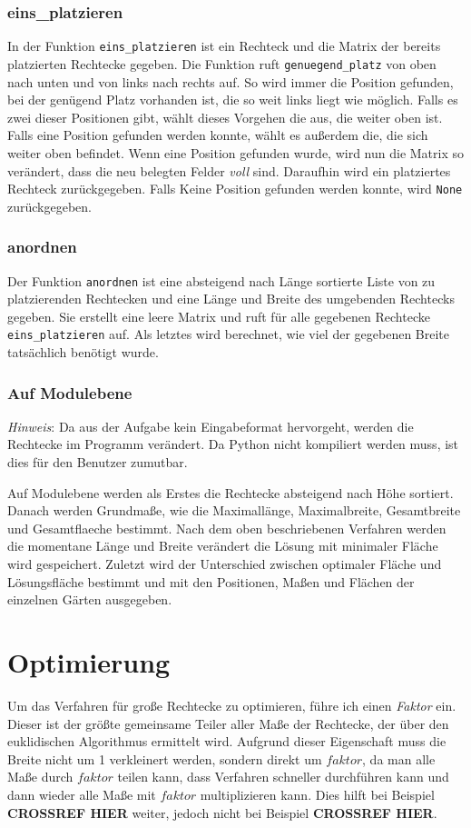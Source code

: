 \documentclass[a4paper,10pt,ngerman]{scrartcl}
\begin{document}
\subsubsection{eins\_platzieren}
In der Funktion \texttt{eins\_platzieren} ist ein Rechteck und die Matrix der bereits platzierten Rechtecke gegeben. Die Funktion ruft \texttt{genuegend\_platz} von oben nach unten und von links nach rechts auf. So wird immer die Position gefunden, bei der genügend Platz vorhanden ist, die so weit links liegt wie möglich. Falls es zwei dieser Positionen gibt, wählt dieses Vorgehen die aus, die weiter oben ist. Falls eine Position gefunden werden konnte, wählt es außerdem die, die sich weiter oben befindet. Wenn eine Position gefunden wurde, wird nun die Matrix so verändert, dass die neu belegten Felder \textit{voll} sind. Daraufhin wird ein platziertes Rechteck zurückgegeben. Falls Keine Position gefunden werden konnte, wird \texttt{None} zurückgegeben.

\subsubsection{anordnen}
Der Funktion \texttt{anordnen} ist eine absteigend nach Länge sortierte Liste von zu platzierenden Rechtecken und eine Länge und Breite des umgebenden Rechtecks gegeben. Sie erstellt eine leere Matrix und ruft für alle gegebenen Rechtecke \texttt{eins\_platzieren} auf. Als letztes wird berechnet, wie viel der gegebenen Breite tatsächlich benötigt wurde.

\subsubsection{Auf Modulebene}
\textit{Hinweis}: Da aus der Aufgabe kein Eingabeformat hervorgeht, werden die Rechtecke im Programm verändert. Da Python nicht kompiliert werden muss, ist dies für den Benutzer zumutbar. 

Auf Modulebene werden als Erstes die Rechtecke absteigend nach Höhe sortiert. Danach werden Grundmaße, wie die Maximallänge, Maximalbreite, Gesamtbreite und Gesamtflaeche bestimmt. Nach dem oben beschriebenen Verfahren werden die momentane Länge und Breite verändert die Lösung mit minimaler Fläche wird gespeichert. Zuletzt wird der Unterschied zwischen optimaler Fläche und Lösungsfläche bestimmt und mit den Positionen, Maßen und Flächen der einzelnen Gärten ausgegeben.

\section{Optimierung}
Um das Verfahren für große Rechtecke zu optimieren, führe ich einen \textit{Faktor} ein. Dieser ist der größte gemeinsame Teiler aller Maße der Rechtecke, der über den euklidischen Algorithmus ermittelt wird. Aufgrund dieser Eigenschaft muss die Breite nicht um 1 verkleinert werden, sondern direkt um $faktor$, da man alle Maße durch $faktor$ teilen kann, dass Verfahren schneller durchführen kann und dann wieder alle Maße mit $faktor$ multiplizieren kann. Dies hilft bei Beispiel \textbf{CROSSREF HIER} weiter, jedoch nicht bei Beispiel \textbf{CROSSREF HIER}.
\end{document}
